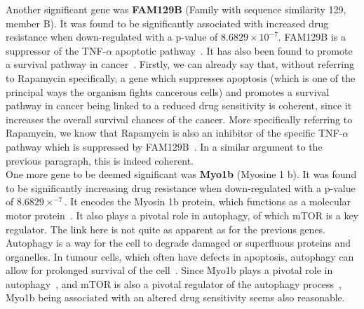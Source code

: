 Another significant gene was \textbf{FAM129B} (Family with sequence similarity 129, member B). It was found to be significantly associated with increased drug resistance when down-regulated with a p-value of $8.6829\times10^{-7}$. FAM129B is a suppressor of the TNF-$\alpha$ apoptotic pathway~\cite{fam129b}. It has also been found to promote a survival pathway in cancer~\cite{fam129b}. Firstly, we can already say that, without referring to Rapamycin specifically, a gene which suppresses apoptosis (which is one of the principal ways the organism fights cancerous cells) and promotes a survival pathway in cancer being linked to a reduced drug sensitivity is coherent, since it increases the overall survival chances of the cancer. More specifically referring to Rapamycin, we know that Rapamycin is also an inhibitor of the specific TNF-$\alpha$ pathway which is suppressed by FAM129B~\cite{tnfalpha}. In a similar argument to the previous paragraph, this is indeed coherent.\\
One more gene to be deemed significant was \textbf{Myo1b} (Myosine 1 b). It was found to be significantly increasing drug resistance when down-regulated with a p-value of $8.6829\times^{-7}$. It encodes the Myosin 1b protein, which functions as a molecular motor protein~\cite{myo1b_function}. It also plays a pivotal role in autophagy, of which mTOR is a key regulator. The link here is not quite as apparent as for the previous genes. Autophagy is a way for the cell to degrade damaged or superfluous proteins and organelles. In tumour cells, which often have defects in apoptosis, autophagy can allow for prolonged survival of the cell~\cite{autophagy_cancer}. Since Myo1b plays a pivotal role in autophagy~\cite{myo1b}, and mTOR is also a pivotal regulator of the autophagy process~\cite{mtor_autophagy}, Myo1b being associated with an altered drug sensitivity seems also reasonable.

